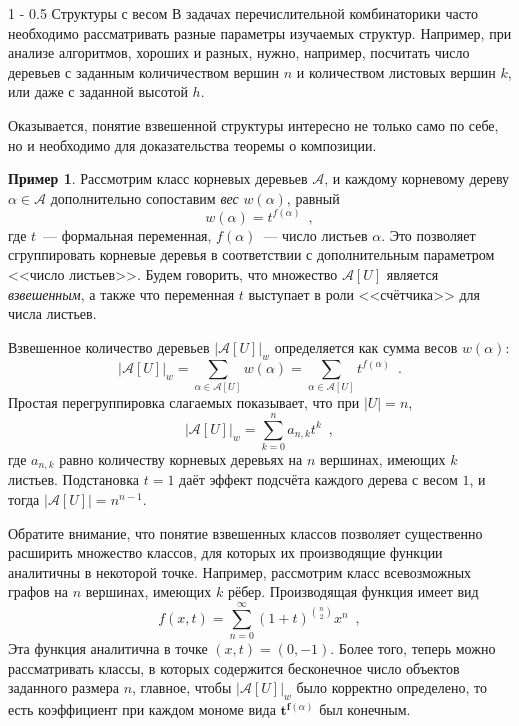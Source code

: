 \documentclass[a5paper]{article}
\makeatletter
\def \vec {\boldsymbol}
\theoremstyle{definition}
\newtheorem{example}{Пример}
\renewcommand{\section}{\@startsection
{section}%
{1}%
{\z@}%
{-\baselineskip}%
{0.5\baselineskip}%
{\centering\large\scshape}} %
\makeatother
\begin{document}
\section{Структуры с весом}
В задачах перечислительной комбинаторики часто необходимо рассматривать разные
параметры изучаемых структур. Например, при анализе алгоритмов, хороших и
разных, нужно, например, посчитать число деревьев с заданным количичеством
вершин \( n \) и количеством листовых вершин \( k \), или даже с заданной
высотой \( h \).

    Оказывается, понятие взвешенной структуры интересно не только само по себе,
но и необходимо для доказательства теоремы о композиции.

\begin{example}
    Рассмотрим класс корневых деревьев \( \mathcal A \), и каждому корневому
дереву \( \alpha \in \mathcal A \) дополнительно сопоставим \textit{вес} \(
w(\alpha) \), равный
\[
    w(\alpha) = t^{f(\alpha)} \enspace ,
\]
где \( t \)~--- формальная переменная, \( f(\alpha) \)~--- число листьев
\(\alpha\). Это позволяет сгруппировать корневые деревья в соответствии с
дополнительным параметром <<число листьев>>. Будем говорить, что множество \(
\mathcal A[U] \) является \textit{взвешенным}, а также что переменная \( t \)
выступает в роли <<счётчика>> для числа листьев.

Взвешенное количество деревьев \( |\mathcal A[U]|_w \) определяется как сумма
весов \( w(\alpha) \):
\[
    | \mathcal A[U] |_w = \sum_{\alpha \in \mathcal A[U]} w(\alpha) = \sum_{\alpha \in
\mathcal A[U]} t^{f(\alpha)} \enspace .
\]
Простая перегруппировка слагаемых показывает, что при \( |U| = n \),
\[
    | \mathcal A[U] |_w = \sum_{k=0}^n a_{n,k} t^k \enspace ,
\]
где \( a_{n,k}\) равно количеству корневых деревьях на \( n \) вершинах, имеющих
\( k \) листьев. Подстановка \( t = 1 \) даёт эффект подсчёта каждого дерева с
весом \( 1 \), и тогда \( | \mathcal A[U] | = n^{n-1} \).
\end{example}

Обратите внимание, что понятие взвешенных классов позволяет существенно
расширить множество классов, для которых их производящие функции аналитичны в
некоторой точке. Например, рассмотрим класс всевозможных графов на \( n \) вершинах,
имеющих \( k \) рёбер. Производящая функция имеет вид
\[
    f(x, t) = \sum_{n = 0}^\infty (1 + t)^{ {n \choose 2} } x^n \enspace ,
\]
Эта функция аналитична в точке \( (x, t) = (0, -1) \).
Более того, теперь можно рассматривать классы, в которых содержится бесконечное
число объектов заданного размера \( n \), главное, чтобы \( |\mathcal A[U]|_w \)
было корректно определено, то есть коэффициент при каждом мономе вида \( \vec
t^{\vec f(\alpha)} \) был конечным.
\end{document}
